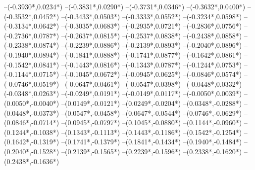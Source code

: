 {	--({-0.3930*\xskala},{0.0234*\yskala})
	--({-0.3831*\xskala},{0.0290*\yskala})
	--({-0.3731*\xskala},{0.0346*\yskala})
	--({-0.3632*\xskala},{0.0400*\yskala})
	--({-0.3532*\xskala},{0.0452*\yskala})
	--({-0.3433*\xskala},{0.0503*\yskala})
	--({-0.3333*\xskala},{0.0552*\yskala})
	--({-0.3234*\xskala},{0.0598*\yskala})
	--({-0.3134*\xskala},{0.0642*\yskala})
	--({-0.3035*\xskala},{0.0683*\yskala})
	--({-0.2935*\xskala},{0.0721*\yskala})
	--({-0.2836*\xskala},{0.0756*\yskala})
	--({-0.2736*\xskala},{0.0787*\yskala})
	--({-0.2637*\xskala},{0.0815*\yskala})
	--({-0.2537*\xskala},{0.0838*\yskala})
	--({-0.2438*\xskala},{0.0858*\yskala})
	--({-0.2338*\xskala},{0.0874*\yskala})
	--({-0.2239*\xskala},{0.0886*\yskala})
	--({-0.2139*\xskala},{0.0893*\yskala})
	--({-0.2040*\xskala},{0.0896*\yskala})
	--({-0.1940*\xskala},{0.0894*\yskala})
	--({-0.1841*\xskala},{0.0888*\yskala})
	--({-0.1741*\xskala},{0.0877*\yskala})
	--({-0.1642*\xskala},{0.0861*\yskala})
	--({-0.1542*\xskala},{0.0841*\yskala})
	--({-0.1443*\xskala},{0.0816*\yskala})
	--({-0.1343*\xskala},{0.0787*\yskala})
	--({-0.1244*\xskala},{0.0753*\yskala})
	--({-0.1144*\xskala},{0.0715*\yskala})
	--({-0.1045*\xskala},{0.0672*\yskala})
	--({-0.0945*\xskala},{0.0625*\yskala})
	--({-0.0846*\xskala},{0.0574*\yskala})
	--({-0.0746*\xskala},{0.0519*\yskala})
	--({-0.0647*\xskala},{0.0461*\yskala})
	--({-0.0547*\xskala},{0.0398*\yskala})
	--({-0.0448*\xskala},{0.0332*\yskala})
	--({-0.0348*\xskala},{0.0263*\yskala})
	--({-0.0249*\xskala},{0.0191*\yskala})
	--({-0.0149*\xskala},{0.0117*\yskala})
	--({-0.0050*\xskala},{0.0039*\yskala})
	--({0.0050*\xskala},{-0.0040*\yskala})
	--({0.0149*\xskala},{-0.0121*\yskala})
	--({0.0249*\xskala},{-0.0204*\yskala})
	--({0.0348*\xskala},{-0.0288*\yskala})
	--({0.0448*\xskala},{-0.0373*\yskala})
	--({0.0547*\xskala},{-0.0458*\yskala})
	--({0.0647*\xskala},{-0.0544*\yskala})
	--({0.0746*\xskala},{-0.0629*\yskala})
	--({0.0846*\xskala},{-0.0714*\yskala})
	--({0.0945*\xskala},{-0.0797*\yskala})
	--({0.1045*\xskala},{-0.0880*\yskala})
	--({0.1144*\xskala},{-0.0960*\yskala})
	--({0.1244*\xskala},{-0.1038*\yskala})
	--({0.1343*\xskala},{-0.1113*\yskala})
	--({0.1443*\xskala},{-0.1186*\yskala})
	--({0.1542*\xskala},{-0.1254*\yskala})
	--({0.1642*\xskala},{-0.1319*\yskala})
	--({0.1741*\xskala},{-0.1379*\yskala})
	--({0.1841*\xskala},{-0.1434*\yskala})
	--({0.1940*\xskala},{-0.1484*\yskala})
	--({0.2040*\xskala},{-0.1528*\yskala})
	--({0.2139*\xskala},{-0.1565*\yskala})
	--({0.2239*\xskala},{-0.1596*\yskala})
	--({0.2338*\xskala},{-0.1620*\yskala})
	--({0.2438*\xskala},{-0.1636*\yskala})
}
